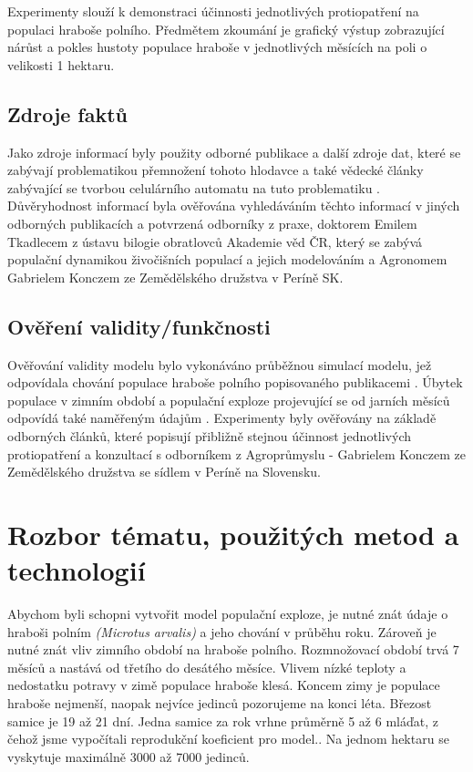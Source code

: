 \documentclass[a4paper,11pt]{article}
\begin{document}
Experimenty slouží k demonstraci účinnosti jednotlivých protiopatření na populaci hraboše polního. Předmětem zkoumání je grafický výstup zobrazující nárůst  a  pokles hustoty populace hraboše v jednotlivých měsících na poli o velikosti 1 hektaru. 

\subsection{Zdroje faktů}
Jako zdroje informací byly použity odborné publikace\cite{prubehvyvoje} a další zdroje dat\cite{letak}, které se zabývají problematikou přemnožení tohoto hlodavce a také vědecké články zabývající se tvorbou celulárního automatu na tuto problematiku \cite{OurCA}. Důvěryhodnost informací byla ověřována vyhledáváním těchto informací v jiných odborných publikacích \cite{fluktuace} \cite{prubehvyvoje} a potvrzená odborníky z praxe, doktorem Emilem Tkadlecem z ústavu bilogie obratlovců Akademie věd ČR, který se zabývá populační dynamikou živočišních populací a jejich modelováním a Agronomem Gabrielem Konczem ze Zemědělského družstva v Períně SK.

\subsection{Ověření validity/funkčnosti}
Ověřování validity modelu bylo vykonáváno průběžnou simulací modelu, jež odpovídala chování populace hraboše polního popisovaného publikacemi \cite{letak}\cite{fluktuace}\cite{prubehvyvoje}\cite{Voles-popul-data:online}\cite{diplom-Tkadlec}. Úbytek populace v zimním období a populační exploze projevující se od jarních měsíců odpovídá také naměřeným údajům \cite{Winter-temp:online}. Experimenty byly ověřovány na základě odborných článků, které popisují přibližně stejnou účinnost jednotlivých protiopatření a konzultací s odborníkem z Agroprůmyslu - Gabrielem Konczem ze Zemědělského družstva se sídlem v Períně na Slovensku.   

\section{Rozbor tématu, použitých metod a technologií}
Abychom byli schopni vytvořit model populační exploze, je nutné znát údaje o hraboši polním \textit{(Microtus arvalis)} a jeho chování v průběhu roku.
 Zároveň je nutné znát vliv zimního období na hraboše polního. Rozmnožovací období trvá 7 měsíců a nastává od třetího do desátého měsíce.\cite{diplom-Tkadlec} Vlivem nízké teploty a nedostatku potravy v zimě populace hraboše klesá. Koncem zimy je populace hraboše nejmenší, naopak nejvíce jedinců pozorujeme na konci léta.\cite{Winter-temp:online} Březost samice je 19 až 21 dní. Jedna samice za rok vrhne průměrně 5 až 6 mláďat\cite{diplom-Tkadlec}, z čehož jsme vypočítali reprodukční koeficient pro model.\cite{OurCA}. Na jednom hektaru se vyskytuje maximálně 3000 až 7000 jedinců. \cite{hustoty}
\end{document}
